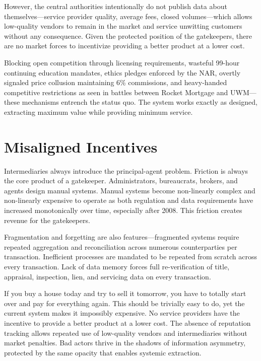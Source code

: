 However, the central authorities intentionally do not publish data about themselves---service provider quality, average fees, closed volumes---which allows low-quality vendors to remain in the market and service unwitting customers without any consequence. Given the protected position of the gatekeepers, there are no market forces to incentivize providing a better product at a lower cost.

Blocking open competition through licensing requirements, wasteful 99-hour continuing education mandates, ethics pledges enforced by the NAR, overtly signaled price collusion maintaining 6\% commissions, and heavy-handed competitive restrictions as seen in battles between Rocket Mortgage and UWM---these mechanisms entrench the status quo. The system works exactly as designed, extracting maximum value while providing minimum service.

\section{Misaligned Incentives}

Intermediaries always introduce the principal-agent problem. Friction is always the core product of a gatekeeper. Administrators, bureaucrats, brokers, and agents design manual systems. Manual systems become non-linearly complex and non-linearly expensive to operate as both regulation and data requirements have increased monotonically over time, especially after 2008. This friction creates revenue for the gatekeepers.

Fragmentation and forgetting are also features---fragmented systems require repeated aggregation and reconciliation across numerous counterparties per transaction. Inefficient processes are mandated to be repeated from scratch across every transaction. Lack of data memory forces full re-verification of title, appraisal, inspection, lien, and servicing data on every transaction.

If you buy a house today and try to sell it tomorrow, you have to totally start over and pay for everything again. This should be trivially easy to do, yet the current system makes it impossibly expensive. No service providers have the incentive to provide a better product at a lower cost. The absence of reputation tracking allows repeated use of low-quality vendors and intermediaries without market penalties. Bad actors thrive in the shadows of information asymmetry, protected by the same opacity that enables systemic extraction.

